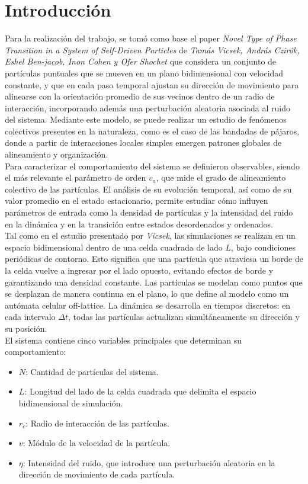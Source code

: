 \documentclass[12pt,a4paper]{article}
\begin{document}
\section{Introducción}

Para la realización del trabajo, se tomó como base el paper \textit{Novel Type of Phase Transition in a System of Self-Driven Particles} de \textit{Tamás Vicsek, András Czirók, Eshel Ben-jacob, Inon Cohen y Ofer Shochet} que considera un conjunto de partículas puntuales que se mueven en un plano bidimensional con velocidad constante, y que en cada paso temporal ajustan su dirección de movimiento para alinearse con la orientación promedio de sus vecinos dentro de un radio de interacción, incorporando además una perturbación aleatoria asociada al ruido del sistema. Mediante este modelo, se puede realizar un estudio de fenómenos colectivos presentes en la naturaleza, como es el caso de las bandadas de pájaros, donde a partir de interacciones locales simples emergen patrones globales de alineamiento y organización.\\

Para caracterizar el comportamiento del sistema se definieron observables, siendo el más relevante el parámetro de orden $v_a$, que mide el grado de alineamiento colectivo de las partículas. El análisis de su evolución temporal, así como de su valor promedio en el estado estacionario, permite estudiar cómo influyen parámetros de entrada como la densidad de partículas y la intensidad del ruido en la dinámica y en la transición entre estados desordenados y ordenados.\\

Tal como en el estudio presentado por \textit{Vicsek}, las simulaciones se realizan en un espacio bidimensional dentro de una celda cuadrada de lado $L$, bajo condiciones periódicas de contorno. Esto significa que una partícula que atraviesa un borde de la celda vuelve a ingresar por el lado opuesto, evitando efectos de borde y garantizando una densidad constante. Las partículas se modelan como puntos que se desplazan de manera continua en el plano, lo que define al modelo como un autómata celular off-lattice. La dinámica se desarrolla en tiempos discretos: en cada intervalo $\Delta t$, todas las partículas actualizan simultáneamente su dirección y su posición.\\


El sistema contiene cinco variables principales que determinan su comportamiento:

\begin{itemize}
    \item $N$: Cantidad de partículas del sistema.
    \item $L$: Longitud del lado de la celda cuadrada que delimita el espacio bidimensional de simulación.
    \item $r_c$: Radio de interacción de las partículas.
    \item $v$: Módulo de la velocidad de la partícula.
    \item $\eta$: Intensidad del ruido, que introduce una perturbación aleatoria en la dirección de movimiento de cada partícula.
\end{itemize}
\end{document}
